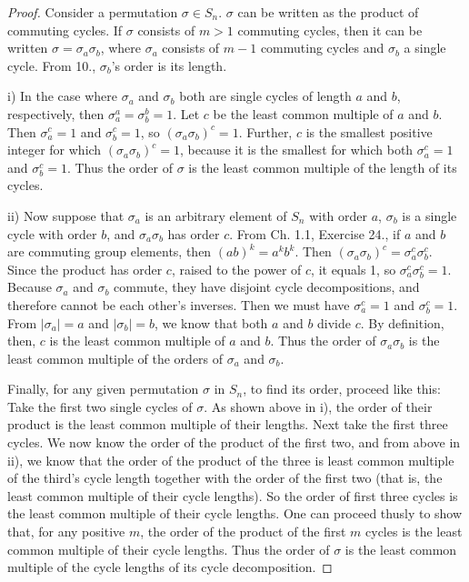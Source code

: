 \documentclass{article}
\begin{document}
\begin{proof}
    Consider a permutation $\sigma \in S_n$. $\sigma$ can be written as the product of commuting cycles. If $\sigma$ consists of $m > 1$ commuting cycles, then it can be written $\sigma = \sigma_a \sigma_b$, where $\sigma_a$ consists of $m - 1$ commuting cycles and $\sigma_b$ a single cycle. From 10., $\sigma_b$'s order is its length.

    i) In the case where $\sigma_a$ and $\sigma_b$ both are single cycles of length $a$ and $b$, respectively, then $\sigma_a^a = \sigma_b^b = 1$. Let $c$ be the least common multiple of $a$ and $b$. Then $\sigma_a^c = 1$ and $\sigma_b^c = 1$, so $(\sigma_a \sigma_b)^c = 1$. Further, $c$ is the smallest positive integer for which $(\sigma_a \sigma_b)^c = 1$, because it is the smallest for which both $\sigma_a^c = 1$ and $\sigma_b^c = 1$. Thus the order of $\sigma$ is the least common multiple of the length of its cycles.
    
    ii) Now suppose that $\sigma_a$ is an arbitrary element of $S_n$ with order $a$, $\sigma_b$ is a single cycle with order $b$, and $\sigma_a \sigma_b$ has order $c$. From Ch. 1.1, Exercise 24., if $a$ and $b$ are commuting group elements, then $(ab)^k = a^k b^k$. Then $(\sigma_a \sigma_b)^c = \sigma_a^c \sigma_b^c$. Since the product has order $c$, raised to the power of $c$, it equals 1, so $\sigma_a^c \sigma_b^c = 1$. Because $\sigma_a$ and $\sigma_b$ commute, they have disjoint cycle decompositions, and therefore cannot be each other's inverses. Then we must have $\sigma_a^c = 1$ and $\sigma_b^c = 1$. From $|\sigma_a| = a$ and $|\sigma_b| = b$, we know that both $a$ and $b$ divide $c$. By definition, then, $c$ is the least common multiple of $a$ and $b$. Thus the order of $\sigma_a \sigma_b$ is the least common multiple of the orders of $\sigma_a$ and $\sigma_b$.

    Finally, for any given permutation $\sigma$ in $S_n$, to find its order, proceed like this: Take the first two single cycles of $\sigma$. As shown above in i), the order of their product is the least common multiple of their lengths. Next take the first three cycles. We now know the order of the product of the first two, and from above in ii), we know that the order of the product of the three is least common multiple of the third's cycle length together with the order of the first two (that is, the least common multiple of their cycle lengths). So the order of first three cycles is the least common multiple of their cycle lengths. One can proceed thusly to show that, for any positive $m$, the order of the product of the first $m$ cycles is the least common multiple of their cycle lengths. Thus the order of $\sigma$ is the least common multiple of the cycle lengths of its cycle decomposition.
\end{proof}
\end{document}
